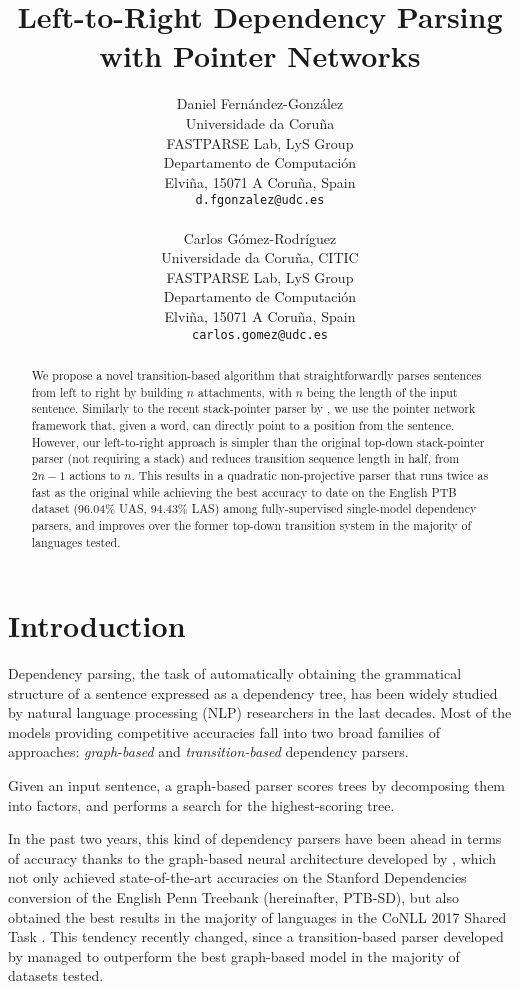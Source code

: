 \documentclass[11pt,a4paper]{article}
\title{Left-to-Right Dependency Parsing with Pointer Networks}
\author{
  Daniel Fern\'{a}ndez-Gonz\'{a}lez\\
  Universidade da Coru\~{n}a\\
  FASTPARSE Lab, LyS Group \\
  Departamento de Computaci\'{o}n \\
  Elvi\~{n}a, 15071 A Coru\~{n}a, Spain \\
  {\tt d.fgonzalez@udc.es} \\
  \\\And
  Carlos G\'{o}mez-Rodr\'{i}guez \\
  Universidade da Coru\~{n}a, CITIC \\
  FASTPARSE Lab, LyS Group \\
  Departamento de Computaci\'{o}n \\
  Elvi\~{n}a, 15071 A Coru\~{n}a, Spain \\
  {\tt carlos.gomez@udc.es}  \\}
\date{}
\begin{document}
\maketitle
\begin{abstract}

We propose a novel transition-based algorithm that straightforwardly parses sentences from left to right by building $n$ attachments, with $n$ being the length of the input sentence. Similarly to the recent stack-pointer parser by \citet{Ma18}, we use the pointer network framework that, given a word, can directly point to a position from the sentence. However, our left-to-right approach is simpler than the original top-down stack-pointer parser (not requiring a stack) and reduces transition sequence length in half, from $2n-1$ actions to $n$. This results in a quadratic non-projective parser that runs twice as fast as the original while achieving the best accuracy to date on the English PTB dataset (96.04\% UAS, 94.43\% LAS) among fully-supervised single-model dependency parsers, and improves over the former top-down transition system in the majority of languages tested.

\end{abstract}

\section{Introduction}
Dependency parsing, the task of automatically obtaining the grammatical structure of a sentence expressed as a dependency tree, has been widely studied by natural language processing (NLP) researchers in the last decades. Most of the models providing competitive accuracies fall into two broad families of approaches: \textit{graph-based} \cite{mcdonald05acl,mcdonald05emnlp}  and \textit{transition-based} \cite{yamada03,Nivre2003} dependency parsers.

Given an input sentence, a graph-based parser scores trees by decomposing them into factors, and performs a search for the highest-scoring tree.

In the past two years, this kind of dependency parsers have 
been ahead in terms of accuracy thanks to
the graph-based neural architecture developed by \citet{DozatM16}, which not only achieved state-of-the-art accuracies on the Stanford Dependencies conversion of the English Penn Treebank (hereinafter, PTB-SD), but also
obtained the best results in the majority of languages
in the CoNLL 2017 Shared Task \cite{DozatQM17}. This tendency recently changed, since a transition-based parser developed by \citet{Ma18} managed to outperform the best graph-based model in 
the majority of
datasets tested. 
\end{document}

